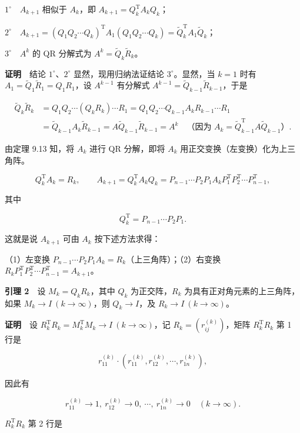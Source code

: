 \(1^\circ\)　\(A_{k+1}\) 相似于 \(A_k\)，即 \(A_{k+1}=Q_k^{\mathrm T}A_kQ_k\)；

\(2^\circ\)　\(A_{k+1}=(Q_1Q_2\cdots Q_k)^{\mathrm T}A_1(Q_1Q_2\cdots Q_k)=\widetilde Q_k^{\mathrm T}A_1\widetilde Q_k\)；

\(3^\circ\)　\(A^k\) 的 QR 分解式为 \(A^k=\widetilde Q_k\widetilde R_k\)。

\textbf{证明}　结论 \(1^\circ\)、\(2^\circ\) 显然，现用归纳法证结论 \(3^\circ\)。显然，当 \(k=1\) 时有 \(A_1=\widetilde Q_1\widetilde R_1=Q_1R_1\)，设 \(A^{k-1}\) 有分解式 \(A^{k-1}=\widetilde Q_{k-1}\widetilde R_{k-1}\)，于是

\[
\begin{aligned}
\widetilde Q_k\widetilde R_k
&=Q_1Q_2\cdots(Q_kR_k)\cdots R_1
=Q_1Q_2\cdots Q_{k-1}A_kR_{k-1}\cdots R_1\\
&=\widetilde Q_{k-1}A_k\widetilde R_{k-1}
=A\widetilde Q_{k-1}\widetilde R_{k-1}=A^k
\quad\text{（因为 }A_k=\widetilde Q_{k-1}^{\mathrm T}A\widetilde Q_{k-1}\text{）}.
\end{aligned}
\]

由定理 9.13 知，将 \(A_k\) 进行 QR 分解，即将 \(A_k\) 用正交变换（左变换）化为上三角阵。

\[
Q_k^{\mathrm T}A_k=R_k,\qquad
A_{k+1}=Q_k^{\mathrm T}A_kQ_k=P_{n-1}\cdots P_2P_1A_kP_1^{\mathrm T}P_2^{\mathrm T}\cdots P_{n-1}^{\mathrm T},
\]

其中

\[
Q_k^{\mathrm T}=P_{n-1}\cdots P_2P_1.
\]

这就是说 \(A_{k+1}\) 可由 \(A_k\) 按下述方法求得：

（1）左变换 \(P_{n-1}\cdots P_2P_1A_k=R_k\)（上三角阵）；（2）右变换 \(R_kP_1^{\mathrm T}P_2^{\mathrm T}\cdots P_{n-1}^{\mathrm T}=A_{k+1}\)。

\textbf{引理 2}　设 \(M_k=Q_kR_k\)，其中 \(Q_k\) 为正交阵，\(R_k\) 为具有正对角元素的上三角阵，如果 \(M_k\to I\ (k\to\infty)\)，则 \(Q_k\to I\)，及 \(R_k\to I\ (k\to\infty)\)。

\textbf{证明}　设 \(R_k^{\mathrm T}R_k=M_k^{\mathrm T}M_k\to I\ (k\to\infty)\)，记 \(R_k=(r_{ij}^{(k)})\)，矩阵 \(R_k^{\mathrm T}R_k\) 第 1 行是

\[
r_{11}^{(k)}\cdot(r_{11}^{(k)},r_{12}^{(k)},\cdots,r_{1n}^{(k)}),
\]

因此有

\[
r_{11}^{(k)}\to1,\ r_{12}^{(k)}\to0,\ \cdots,\ r_{1n}^{(k)}\to0\quad(k\to\infty).
\tag{9.4.9}
\]

\(R_k^{\mathrm T}R_k\) 第 2 行是

